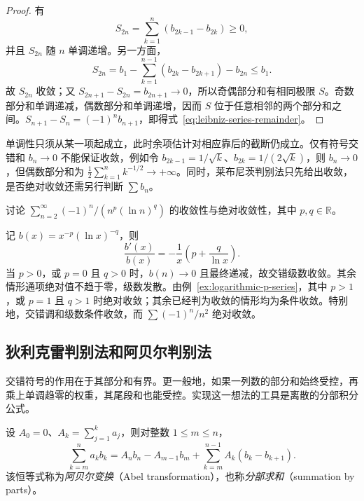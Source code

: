 \documentclass[UTF8,12pt,a4paper,fontset=fandol]{ctexbook}
\begin{document}
\begin{proof}
有
\[
    S_{2n}=\sum_{k=1}^n(b_{2k-1}-b_{2k})\geq0,
\]
并且 $S_{2n}$ 随 $n$ 单调递增。另一方面，
\[
    S_{2n}=b_1-\sum_{k=1}^{n-1}(b_{2k}-b_{2k+1})-b_{2n}\leq b_1.
\]
故 $S_{2n}$ 收敛；又 $S_{2n+1}-S_{2n}=b_{2n+1}\to0$，所以奇偶部分和有相同极限 $S$。奇数部分和单调递减，偶数部分和单调递增，因而 $S$ 位于任意相邻的两个部分和之间。$S_{n+1}-S_n=(-1)^nb_{n+1}$，即得式~\eqref{eq:leibniz-series-remainder}。
\end{proof}

单调性只须从某一项起成立，此时余项估计对相应靠后的截断仍成立。仅有符号交错和 $b_n\to0$ 不能保证收敛，例如令 $b_{2k-1}=1/\sqrt{k}$、$b_{2k}=1/(2\sqrt{k})$，则 $b_n\to0$，但偶数部分和为 $\frac12\sum_{k=1}^n k^{-1/2}\to+\infty$。同时，莱布尼茨判别法只先给出收敛，是否绝对收敛还需另行判断 $\sum b_n$。

\begin{example}
\label{ex:alternating-logarithmic-p-series}
讨论 $\sum_{n=2}^{\infty}(-1)^n/(n^p(\ln n)^q)$ 的收敛性与绝对收敛性，其中 $p,q\in\mathbb R$。
\end{example}

\begin{solve}
记 $b(x)=x^{-p}(\ln x)^{-q}$，则
\[
    \frac{b'(x)}{b(x)}=-\frac1x\left(p+\frac q{\ln x}\right).
\]
当 $p>0$，或 $p=0$ 且 $q>0$ 时，$b(n)\to0$ 且最终递减，故交错级数收敛。其余情形通项绝对值不趋于零，级数发散。由例~\ref{ex:logarithmic-p-series}，其中 $p>1$，或 $p=1$ 且 $q>1$ 时绝对收敛；其余已经判为收敛的情形均为条件收敛。特别地，交错调和级数条件收敛，而 $\sum(-1)^n/n^2$ 绝对收敛。
\end{solve}

\subsection{狄利克雷判别法和阿贝尔判别法}
\label{subsec:dirichlet-and-abel-tests}

交错符号的作用在于其部分和有界。更一般地，如果一列数的部分和始终受控，再乘上单调趋零的权重，其尾段和也能受控。实现这一想法的工具是离散的分部积分公式。

\begin{lemma}[阿贝尔变换]
\label{lem:abel-summation-by-parts}
设 $A_0=0$、$A_k=\sum_{j=1}^k a_j$，则对整数 $1\leq m\leq n$，
\begin{equation}
    \sum_{k=m}^n a_kb_k
    =A_nb_n-A_{m-1}b_m
      +\sum_{k=m}^{n-1}A_k(b_k-b_{k+1}).
    \label{eq:abel-summation-by-parts}
\end{equation}
该恒等式称为\emph{阿贝尔变换}（Abel transformation），也称\emph{分部求和}（summation by parts）。
\end{lemma}
\end{document}
